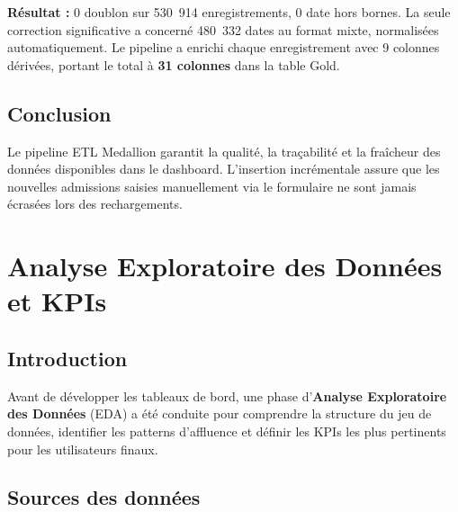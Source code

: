 \documentclass[12pt,a4paper]{report}
\begin{document}
	\begin{successbox}
		\textbf{Résultat :} 0 doublon sur 530~914 enregistrements, 0 date hors bornes.
		La seule correction significative a concerné 480~332 dates au format mixte,
		normalisées automatiquement. Le pipeline a enrichi chaque enregistrement avec
		9 colonnes dérivées, portant le total à \textbf{31 colonnes} dans la table Gold.
	\end{successbox}
	
	\section{Conclusion}
	
	Le pipeline ETL Medallion garantit la qualité, la traçabilité et la fraîcheur des données
	disponibles dans le dashboard. L'insertion incrémentale assure que les nouvelles admissions
	saisies manuellement via le formulaire ne sont jamais écrasées lors des rechargements.
	
	\chapter{Analyse Exploratoire des Données et KPIs}
	
	\section{Introduction}
	
	Avant de développer les tableaux de bord, une phase d'\textbf{Analyse Exploratoire des Données}
	(EDA) a été conduite pour comprendre la structure du jeu de données, identifier les patterns
	d'affluence et définir les KPIs les plus pertinents pour les utilisateurs finaux.
	
	\section{Sources des données}
	
\end{document}
